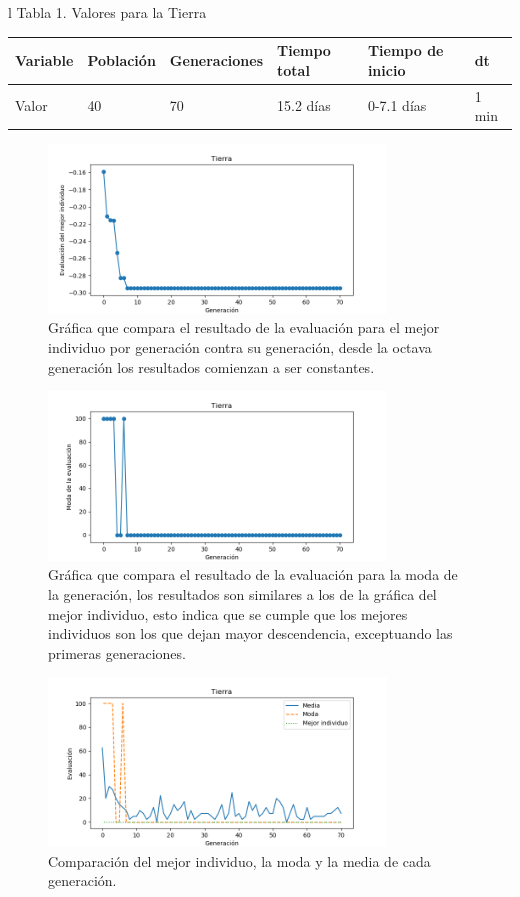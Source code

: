 \documentclass[12pt,letterpaper]{article}
\begin{document}
\begin{tabular}{l}
Tabla 1. Valores para la Tierra \\
	\begin{tabular}{|l|l|l|l|l|l|}
	\hline
	Variable & Población & Generaciones & Tiempo total & Tiempo de inicio & dt \\	\hline 
	Valor & 40  & 70 & 15.2 días & 0-7.1 días & 1 min  \\ \hline
	\end{tabular}
\end{tabular}


\begin{figure}[H]
\centering
\includegraphics[width=0.8\textwidth]{Tierraind}
\caption{Gráfica que compara el resultado de la evaluación para el mejor individuo por generación contra su generación, desde la octava generación los resultados comienzan a ser constantes. }
\end{figure}

\begin{figure}[H]
\centering
\includegraphics[width=0.8\textwidth]{Tierramoda}
\caption{Gráfica que compara el resultado de la evaluación para la moda de la generación, los resultados son similares a los de la gráfica del mejor individuo, esto indica que se cumple que los mejores individuos son los que dejan mayor descendencia, exceptuando las primeras generaciones.}
\end{figure}

\begin{figure}[H]
\centering
\includegraphics[width=0.8\textwidth]{Tierra}
\caption{Comparación del mejor individuo, la moda y la media de cada generación.}
\end{figure}
\end{document}
